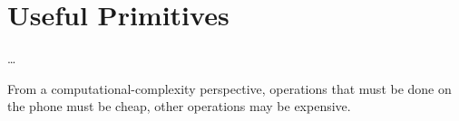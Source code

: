 \mode*

\section{Useful Primitives}
\label{UsefulPrimitives}

\dots

From a computational-complexity perspective, operations that must be done on 
the phone must be cheap, other operations may be expensive.
